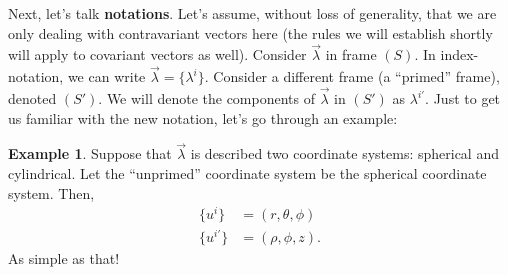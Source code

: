 \documentclass{book}
\theoremstyle{definition}
\newtheorem{exmp}{Example}[section]
\begin{document}
Next, let's talk \textbf{notations}. Let's assume, without loss of generality, that we are only dealing with contravariant vectors here (the rules we will establish shortly will apply to covariant vectors as well). Consider $\vec{\lambda}$ in frame $(S)$. In index-notation, we can write $\vec{\lambda} = \{\lambda^i\}$. Consider a different frame (a ``primed'' frame), denoted $(S')$. We will denote the components of $\vec{\lambda}$ in $(S')$ as $\lambda^{i'}$. Just to get us familiar with the new notation, let's go through an example:
\begin{exmp}
Suppose that $\vec{\lambda}$ is described two coordinate systems: spherical and cylindrical. Let the ``unprimed'' coordinate system be the spherical coordinate system. Then,
\begin{align*}
\{u^i\} &= (r,\theta,\phi)\\
\{u^{i'}\} &= (\rho, \phi, z).
\end{align*}
As simple as that!
\end{exmp}
\end{document}

